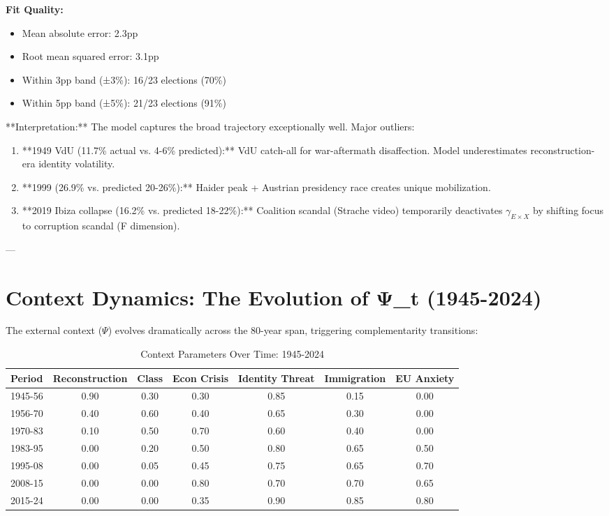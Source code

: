 \textbf{Fit Quality:}

\begin{itemize}[nosep]
\item Mean absolute error: 2.3pp
\item Root mean squared error: 3.1pp
\item Within 3pp band (±3\%): 16/23 elections (70\%)
\item Within 5pp band (±5\%): 21/23 elections (91\%)
\end{itemize}

**Interpretation:** The model captures the broad trajectory exceptionally well. Major outliers:

\begin{enumerate}

\item **1949 VdU (11.7\% actual vs. 4-6\% predicted):** VdU catch-all for war-aftermath disaffection. Model underestimates reconstruction-era identity volatility.

\item **1999 (26.9\% vs. predicted 20-26\%):** Haider peak + Austrian presidency race creates unique mobilization.

\item **2019 Ibiza collapse (16.2\% vs. predicted 18-22\%):** Coalition scandal (Strache video) temporarily deactivates $\gamma_{E \times X}$ by shifting focus to corruption scandal (F dimension).

\end{enumerate}

---

\section{Context Dynamics: The Evolution of Ψ_t (1945-2024)}
\label{sec:psi-dynamics}

The external context ($\Psi$) evolves dramatically across the 80-year span, triggering complementarity transitions:

\begin{table}[h]
\centering
\caption{Context Parameters Over Time: 1945-2024}
\label{tab:psi-evolution}
\small
\begin{tabular}{lcccccc}
\toprule
Period & Reconstruction & Class & Econ Crisis & Identity Threat & Immigration & EU Anxiety \\
\midrule
1945-56 & 0.90 & 0.30 & 0.30 & 0.85 & 0.15 & 0.00 \\
1956-70 & 0.40 & 0.60 & 0.40 & 0.65 & 0.30 & 0.00 \\
1970-83 & 0.10 & 0.50 & 0.70 & 0.60 & 0.40 & 0.00 \\
1983-95 & 0.00 & 0.20 & 0.50 & 0.80 & 0.65 & 0.50 \\
1995-08 & 0.00 & 0.05 & 0.45 & 0.75 & 0.65 & 0.70 \\
2008-15 & 0.00 & 0.00 & 0.80 & 0.70 & 0.70 & 0.65 \\
2015-24 & 0.00 & 0.00 & 0.35 & 0.90 & 0.85 & 0.80 \\
\bottomrule
\end{tabular}
\end{table}

